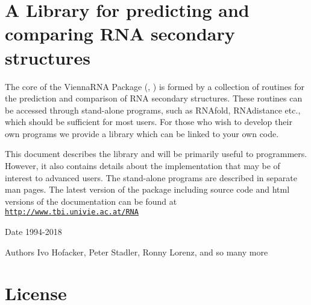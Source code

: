 \hypertarget{index_introduction}{}\section{A Library for predicting and comparing R\+N\+A secondary structures}\label{index_introduction}
The core of the Vienna\+R\+NA Package (\cite{lorenz:2011}, \cite{hofacker:1994}) is formed by a collection of routines for the prediction and comparison of R\+NA secondary structures. These routines can be accessed through stand-\/alone programs, such as {\ttfamily R\+N\+Afold}, {\ttfamily R\+N\+Adistance} etc., which should be sufficient for most users. For those who wish to develop their own programs we provide a library which can be linked to your own code.

This document describes the library and will be primarily useful to programmers. However, it also contains details about the implementation that may be of interest to advanced users. The stand-\/alone programs are described in separate man pages. The latest version of the package including source code and html versions of the documentation can be found at ~\newline
~\newline
 \href{http://www.tbi.univie.ac.at/RNA}{\tt http\+://www.\+tbi.\+univie.\+ac.\+at/\+R\+NA}

\begin{DoxyDate}{Date}
1994-\/2018 
\end{DoxyDate}
\begin{DoxyAuthor}{Authors}
Ivo Hofacker, Peter Stadler, Ronny Lorenz, and so many more
\end{DoxyAuthor}
\hypertarget{index_license}{}\section{License}\label{index_license}


